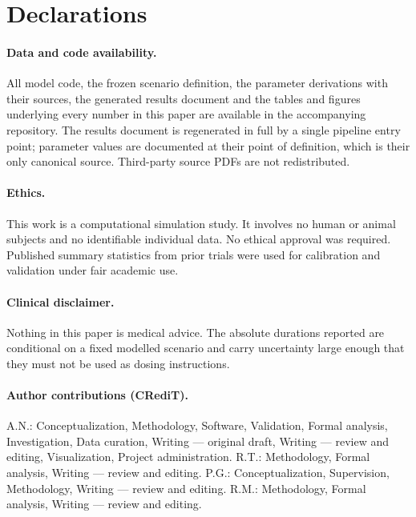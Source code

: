 \documentclass[11pt]{article}
\begin{document}
\section*{Declarations}

\paragraph{Data and code availability.} All model code, the frozen
scenario definition, the parameter derivations with their sources, the
generated results document and the tables and figures underlying every
number in this paper are available in the accompanying repository. The
results document is regenerated in full by a single pipeline entry
point; parameter values are documented at their point of definition,
which is their only canonical source. Third-party source PDFs are not
redistributed.

\paragraph{Ethics.} This work is a computational simulation study. It
involves no human or animal subjects and no identifiable individual
data. No ethical approval was required. Published summary statistics
from prior trials were used for calibration and validation under fair
academic use.

\paragraph{Clinical disclaimer.} Nothing in this paper is medical
advice. The absolute durations reported are conditional on a fixed
modelled scenario and carry uncertainty large enough that they must
not be used as dosing instructions.

\paragraph{Author contributions (CRediT).} A.N.: Conceptualization,
Methodology, Software, Validation, Formal analysis, Investigation,
Data curation, Writing --- original draft, Writing --- review and
editing, Visualization, Project administration. R.T.: Methodology,
Formal analysis, Writing --- review and editing. P.G.: Conceptualization,
Supervision, Methodology, Writing --- review and editing. R.M.: Methodology,
Formal analysis, Writing --- review and editing.
\end{document}
